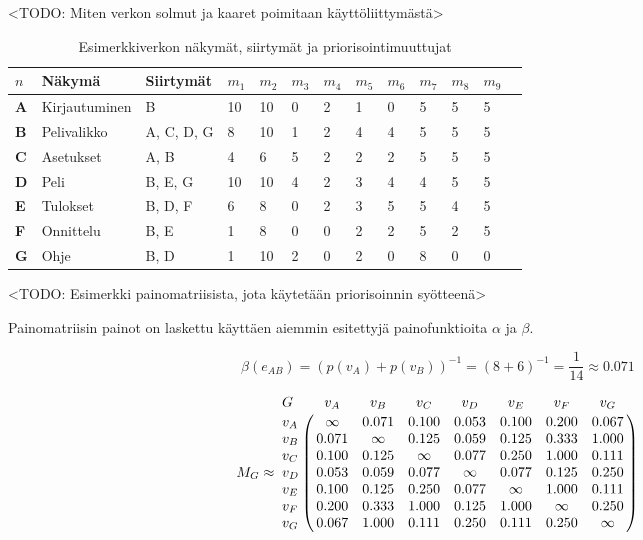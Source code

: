   <TODO: Miten verkon solmut ja kaaret poimitaan käyttöliittymästä>

  \begin{table}[H]
    \caption{Esimerkkiverkon näkymät, siirtymät ja priorisointimuuttujat}
    \label{tab:esimerkki_verkon_priorisointi_muuttujat}
    \centering
    \begin{tabular}{lllllllllllll} \hline
    \(n\) & \textbf{Näkymä} & \textbf{Siirtymät} & \(m_1\) & \(m_2\) & \(m_3\) & \(m_4\) & \(m_5\) & \(m_6\) & \(m_7\) & \(m_8\) & \(m_9\) \\ \hline
    \textbf{A} & Kirjautuminen & B & 10 & 10 & 0 & 2 & 1 & 0 & 5 & 5 & 5 \\
    \textbf{B} & Pelivalikko & A, C, D, G & 8 & 10 & 1 & 2 & 4 & 4 & 5 & 5 & 5 \\
    \textbf{C} & Asetukset & A, B & 4 & 6 & 5 & 2 & 2 & 2 & 5 & 5 & 5 \\
    \textbf{D} & Peli & B, E, G & 10 & 10 & 4 & 2 & 3 & 4 & 4 & 5 & 5 \\
    \textbf{E} & Tulokset & B, D, F & 6 & 8 & 0 & 2 & 3 & 5 & 5 & 4 & 5 \\
    \textbf{F} & Onnittelu & B, E & 1 & 8 & 0 & 0 & 2 & 2 & 5 & 2 & 5 \\
    \textbf{G} & Ohje & B, D & 1 & 10 & 2 & 0 & 2 & 0 & 8 & 0 & 0 \\ \hline
    \end{tabular}
  \end{table}

  <TODO: Esimerkki painomatriisista, jota käytetään priorisoinnin syötteenä>

  Painomatriisin painot on laskettu käyttäen aiemmin esitettyjä painofunktioita \(\alpha\) ja \(\beta\).

  \[\beta(e_{AB}) = (p(v_A) + p(v_B))^{-1} = (8 + 6)^{-1} = \frac{1}{14} \approx 0.071\]

  \[
    M_G \approx
    \bordermatrix{
      G & v_A & v_B & v_C & v_D & v_E & v_F & v_G \cr
      v_A & \infty & 0.071 & 0.100 & 0.053 & 0.100 & 0.200 & 0.067 \cr
      v_B & 0.071 & \infty & 0.125 & 0.059 & 0.125 & 0.333 & 1.000 \cr
      v_C & 0.100 & 0.125 & \infty & 0.077 & 0.250 & 1.000 & 0.111 \cr
      v_D & 0.053 & 0.059 & 0.077 & \infty & 0.077 & 0.125 & 0.250 \cr
      v_E & 0.100 & 0.125 & 0.250 & 0.077 & \infty & 1.000 & 0.111 \cr
      v_F & 0.200 & 0.333 & 1.000 & 0.125 & 1.000 & \infty & 0.250 \cr
      v_G & 0.067 & 1.000 & 0.111 & 0.250 & 0.111 & 0.250 & \infty \cr
    }
  \]

